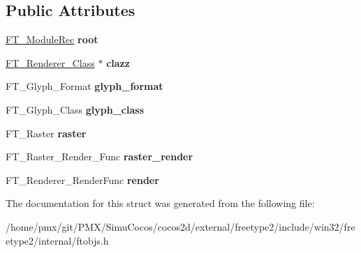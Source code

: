 \subsection*{Public Attributes}
\begin{DoxyCompactItemize}
\item 
\mbox{\label{structFT__RendererRec___a7c93326898f03a9eb224f57104fa2433}} 
\hyperlink{structFT__ModuleRec__}{F\+T\+\_\+\+Module\+Rec} {\bfseries root}
\item 
\mbox{\label{structFT__RendererRec___aef22bfb8e1671a62ecb78361152ff839}} 
\hyperlink{structFT__Renderer__Class__}{F\+T\+\_\+\+Renderer\+\_\+\+Class} $\ast$ {\bfseries clazz}
\item 
\mbox{\label{structFT__RendererRec___a478b14f577b633cea7043fb17d404721}} 
F\+T\+\_\+\+Glyph\+\_\+\+Format {\bfseries glyph\+\_\+format}
\item 
\mbox{\label{structFT__RendererRec___a38a591be1d20fb2b4d81e48ebb624dd7}} 
F\+T\+\_\+\+Glyph\+\_\+\+Class {\bfseries glyph\+\_\+class}
\item 
\mbox{\label{structFT__RendererRec___a9c54a2da84f5892e0563d032ebd1ee09}} 
F\+T\+\_\+\+Raster {\bfseries raster}
\item 
\mbox{\label{structFT__RendererRec___a6dc07268fc39d9dde130a5708607d19d}} 
F\+T\+\_\+\+Raster\+\_\+\+Render\+\_\+\+Func {\bfseries raster\+\_\+render}
\item 
\mbox{\label{structFT__RendererRec___a197bfeb9dde4aef8eee87bc3ea95312e}} 
F\+T\+\_\+\+Renderer\+\_\+\+Render\+Func {\bfseries render}
\end{DoxyCompactItemize}


The documentation for this struct was generated from the following file\+:\begin{DoxyCompactItemize}
\item 
/home/pmx/git/\+P\+M\+X/\+Simu\+Cocos/cocos2d/external/freetype2/include/win32/freetype2/internal/ftobjs.\+h\end{DoxyCompactItemize}
